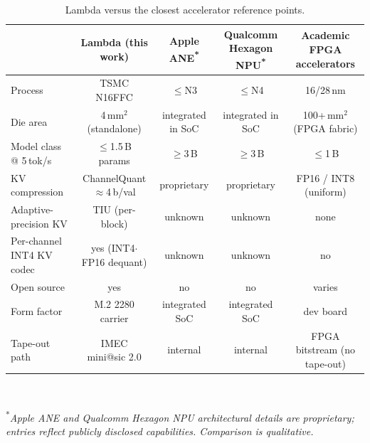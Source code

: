 \documentclass[conference]{IEEEtran}
\begin{document}
\begin{table}[t]
\centering
\caption{Lambda versus the closest accelerator reference points.}
\label{tab:comp}
\setlength{\tabcolsep}{6pt}
\renewcommand{\arraystretch}{1.15}
\footnotesize
\begin{tabular}{lcccc}
\toprule
& \textbf{Lambda (this work)} & \textbf{Apple ANE}\textsuperscript{*} & \textbf{Qualcomm Hexagon NPU}\textsuperscript{*} & \textbf{Academic FPGA accelerators} \\
\midrule
Process                       & TSMC N16FFC          & $\le$N3                & $\le$N4                & 16/28\,nm                       \\
Die area                      & 4\,mm$^2$ (standalone) & integrated in SoC      & integrated in SoC      & 100+\,mm$^2$ (FPGA fabric)      \\
Model class @ 5\,tok/s        & $\le$1.5\,B params   & $\ge$3\,B              & $\ge$3\,B              & $\le$1\,B                       \\
KV compression                & ChannelQuant $\approx$4\,b/val & proprietary   & proprietary            & FP16 / INT8 (uniform)           \\
Adaptive-precision KV         & TIU (per-block)      & unknown                & unknown                & none                            \\
Per-channel INT4 KV codec     & yes (INT4$\cdot$FP16 dequant) & unknown       & unknown                & no                              \\
Open source                   & yes                  & no                     & no                     & varies                          \\
Form factor                   & M.2 2280 carrier     & integrated SoC         & integrated SoC         & dev board                       \\
Tape-out path                 & IMEC mini@sic 2.0    & internal               & internal               & FPGA bitstream (no tape-out)    \\
\bottomrule
\end{tabular}\\[2pt]
\raggedright\footnotesize\textsuperscript{*}\textit{Apple ANE and Qualcomm Hexagon NPU architectural details are proprietary; entries reflect publicly disclosed capabilities. Comparison is qualitative.}
\end{table}

\end{document}
